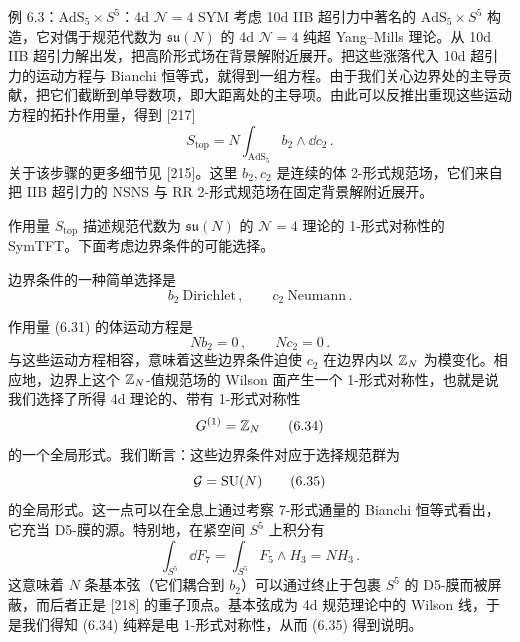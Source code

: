 \begin{examplebox}{例 6.3：$\mathrm{AdS}_5 \times S^5$：4d $\mathcal{N}=4$ SYM}
考虑 10d IIB 超引力中著名的 $\mathrm{AdS}_5 \times S^5$ 构造，它对偶于规范代数为 $\mathfrak{su}(N)$ 的 4d $\mathcal{N}=4$ 纯超 Yang--Mills 理论。从 10d IIB 超引力解出发，把高阶形式场在背景解附近展开。把这些涨落代入 10d 超引力的运动方程与 Bianchi 恒等式，就得到一组方程。由于我们关心边界处的主导贡献，把它们截断到单导数项，即大距离处的主导项。由此可以反推出重现这些运动方程的拓扑作用量，得到 [217]
\begin{equation}
  S_{\mathrm{top}} = N \int_{\mathrm{AdS}_5} b_2 \wedge \dd c_2\,. \tag{6.31}
\end{equation}
关于该步骤的更多细节见 [215]。这里 $b_2,c_2$ 是连续的体 2-形式规范场，它们来自把 IIB 超引力的 NSNS 与 RR 2-形式规范场在固定背景解附近展开。

作用量 $S_{\mathrm{top}}$ 描述规范代数为 $\mathfrak{su}(N)$ 的 $\mathcal{N}=4$ 理论的 1-形式对称性的 SymTFT。下面考虑边界条件的可能选择。

边界条件的一种简单选择是
\begin{equation}
  b_2\ \text{Dirichlet}\,,\qquad c_2\ \text{Neumann}\,. \tag{6.32}
\end{equation}

作用量 (6.31) 的体运动方程是
\begin{equation}
  N b_2 = 0\,,\qquad N c_2 = 0\,. \tag{6.33}
\end{equation}
与这些运动方程相容，意味着这些边界条件迫使 $c_2$ 在边界内以 $\mathbb{Z}_N$ 为模变化。相应地，边界上这个 $\mathbb{Z}_N$-值规范场的 Wilson 面产生一个 1-形式对称性，也就是说我们选择了所得 4d 理论的、带有 1-形式对称性
\begin{equation}
  G^{(1)} = \mathbb{Z}_N \tag{6.34}
\end{equation}
的一个全局形式。我们断言：这些边界条件对应于选择规范群为
\begin{equation}
  \mathcal{G} = \mathrm{SU}(N) \tag{6.35}
\end{equation}
的全局形式。这一点可以在全息上通过考察 7-形式通量的 Bianchi 恒等式看出，它充当 D5-膜的源。特别地，在紧空间 $S^5$ 上积分有
\begin{equation}
  \int_{S^5} \dd F_7 = \int_{S^5} F_5 \wedge H_3 = N H_3\,. \tag{6.36}
\end{equation}
这意味着 $N$ 条基本弦（它们耦合到 $b_2$）可以通过终止于包裹 $S^5$ 的 D5-膜而被屏蔽，而后者正是 [218] 的重子顶点。基本弦成为 4d 规范理论中的 Wilson 线，于是我们得知 (6.34) 纯粹是电 1-形式对称性，从而 (6.35) 得到说明。


\end{examplebox}
